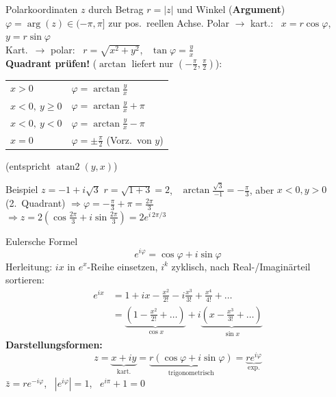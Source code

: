 \documentclass[a4paper, fontsize=7pt]{scrartcl}
\renewcommand*{\arraystretch}{1.5}  %
\begin{document}
\begin{mainbox}{Polarkoordinaten}
$z$ durch Betrag $r = |z|$ und Winkel (\textbf{Argument})
$\varphi = \arg(z) \in (-\pi, \pi]$ zur pos.\ reellen Achse.
Polar $\to$ kart.: \ $x = r\cos\varphi$, \ $y = r\sin\varphi$\\
Kart.\ $\to$ polar: \ $r = \sqrt{x^2 + y^2}$, \ $\tan\varphi = \frac{y}{x}$\\
\textbf{Quadrant prüfen!} ($\arctan$ liefert nur $(-\frac\pi2, \frac\pi2)$):
\renewcommand*{\arraystretch}{1.4}
\setlength{\tabcolsep}{3pt}
\begin{center}
\begin{tabular}{l|l}
$x > 0$ & $\varphi = \arctan\frac{y}{x}$ \\
$x < 0,\ y \ge 0$ & $\varphi = \arctan\frac{y}{x} + \pi$ \\
$x < 0,\ y < 0$ & $\varphi = \arctan\frac{y}{x} - \pi$ \\
$x = 0$ & $\varphi = \pm\frac{\pi}{2}$ (Vorz.\ von $y$) \\
\end{tabular}
\end{center}
(entspricht $\operatorname{atan2}(y, x)$)
\end{mainbox}

\begin{subbox}{Beispiel $z = -1 + i\sqrt3$}
$r = \sqrt{1 + 3} = 2$, \ $\arctan\frac{\sqrt3}{-1} = -\frac\pi3$, aber
$x < 0, y > 0$ (2.\ Quadrant) $\Rightarrow \varphi = -\frac\pi3 + \pi =
\frac{2\pi}{3}$\\
$\Rightarrow z = 2\left(\cos\frac{2\pi}{3} + i\sin\frac{2\pi}{3}\right) =
2e^{i\,2\pi/3}$
\end{subbox}

\begin{mainbox}{Eulersche Formel}
$$\boxed{e^{i\varphi} = \cos\varphi + i\sin\varphi}$$
Herleitung: $ix$ in $e^x$-Reihe einsetzen, $i^k$ zyklisch, nach
Real-/Imaginärteil sortieren:
\begin{align*}
e^{ix} &= 1 + ix - \tfrac{x^2}{2!} - i\tfrac{x^3}{3!} + \tfrac{x^4}{4!}
+ \ldots\\
&= \underbrace{\left(1 - \tfrac{x^2}{2!} + \ldots\right)}_{\cos x}
+ i\underbrace{\left(x - \tfrac{x^3}{3!} + \ldots\right)}_{\sin x}
\end{align*}
\textbf{Darstellungsformen:}
$$z = \underbrace{x + iy}_{\text{kart.}}
= \underbrace{r(\cos\varphi + i\sin\varphi)}_{\text{trigonometrisch}}
= \underbrace{re^{i\varphi}}_{\text{exp.}}$$
$\bar{z} = re^{-i\varphi}$, \ $|e^{i\varphi}| = 1$, \
$e^{i\pi} + 1 = 0$
\end{mainbox}
\end{document}
